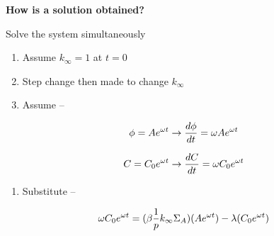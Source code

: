 \documentclass[aspectratio=1610,pdftex,dvipsnames,compress,xcolor={dvipsnames}]{beamer}
\begin{document}
\begin{frame}[plain]{}
    \centering\LARGE\textbf{How is a solution obtained?}
\end{frame}


\addtocounter{framenumber}{-1} 
\begin{frame}{Solve the system simultaneously}
    \begin{enumerate}[series=outerlist,topsep=0pt,itemsep=21pt,leftmargin=*,label=(\arabic*)]
        \item[]Assume $k_\infty = 1$ at $t = 0$
        \item[]Step change then made to change $k_\infty$
        \item[]Assume --
    \end{enumerate}

    \vspace*{\fill}

    \begin{equation}
        \LARGE
        \phi = A e^{\omega t} \rightarrow \frac{d\phi}{dt} = \omega A e^{\omega t}
    \end{equation}

    \begin{equation}
        \LARGE
        C = C_0 e^{\omega t} \rightarrow \frac{dC}{dt} = \omega C_0 e^{\omega t}
    \end{equation}

    \vspace*{\fill}

    \begin{enumerate}[series=outerlist,topsep=0pt,itemsep=21pt,leftmargin=*,label=(\arabic*)]
        \item[]Substitute --
    \end{enumerate}

    \vspace*{\fill}

    \begin{equation}
        \LARGE
        \omega C_0 e^{\omega t}=(\beta \frac{1}{p} k_\infty \Sigma_A)(A e^{\omega t})-\lambda (C_0 e^{\omega t})
    \end{equation}
\end{frame}
\end{document}
